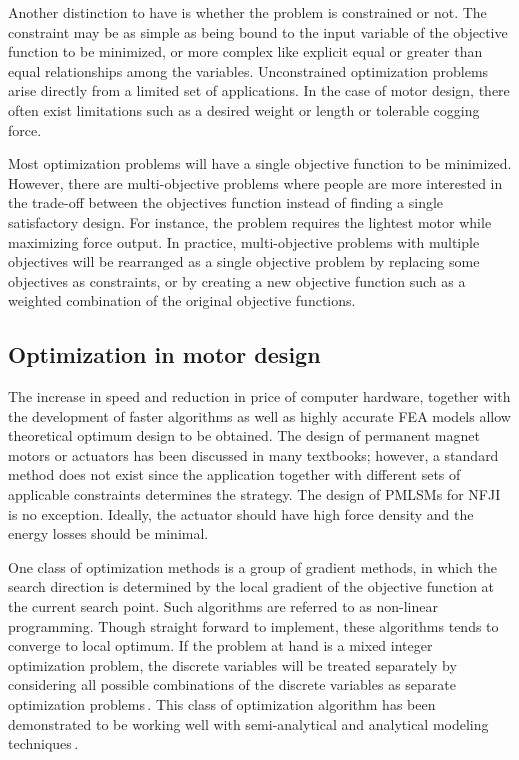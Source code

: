         Another distinction to have is whether the problem is constrained or not. The constraint may be as simple as being bound to the input variable of the objective function to be minimized, or more complex like explicit equal or greater than equal relationships among the variables. Unconstrained optimization problems arise directly from a limited set of applications. In the case of motor design, there often exist limitations such as a desired weight or length or tolerable cogging force.
        
        
        Most optimization problems will have a single objective function to be minimized. However, there are multi-objective problems where people are more interested in the trade-off between the objectives function instead of finding a single satisfactory design. For instance, the problem requires the lightest motor while maximizing force output. In practice, multi-objective problems with multiple objectives will be rearranged as a single objective problem by replacing some objectives as constraints, or by creating a new objective function such as a weighted combination of the original objective functions.
        

    \subsection{Optimization in motor design}        \label{Chapter:background/optimization methods/optimization in motor design}
    
    
        The increase in speed and reduction in price of computer hardware, together with the development of faster algorithms as well as highly accurate \acs{FEA} models allow theoretical optimum design to be obtained. The design of permanent magnet motors or actuators has been discussed in many textbooks; however, a standard method does not exist since the application together with different sets of applicable constraints determines the strategy. The design of \acsp{PMLSM} for \acs{NFJI} is no exception. Ideally, the actuator should have high force density and the energy losses should be minimal. 
    
        
        One class of optimization methods is a group of gradient methods, in which the search direction is determined by the local gradient of the objective function at the current search point. Such algorithms are referred to as non-linear programming. Though straight forward to implement, these algorithms tends to converge to local optimum. If the problem at hand is a mixed integer optimization problem, the discrete variables will be treated separately by considering all possible combinations of the discrete variables as separate optimization problems\,\cite{Ruddy2015a}. This class of optimization algorithm has been demonstrated to be working well with semi-analytical and analytical modeling techniques\,\cite{Overboom2010DesignZ-module,Aleksandrov2018DesignTracks,Fang2008}. 
        
